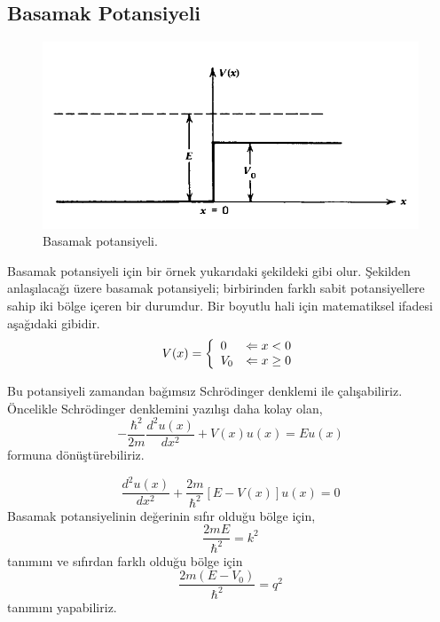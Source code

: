 \documentclass[a4paper,12pt, twoside]{article}
\begin{document}
\subsection{Basamak Potansiyeli}
\begin{figure}[hbtp]
	\centering
	\includegraphics[width=0.7\linewidth]{figurler/Basamak_Potansiyeli}
	\caption{Basamak potansiyeli.}
	\label{fig:basamakpotansiyeli}
\end{figure}
Basamak potansiyeli için bir örnek yukarıdaki şekildeki gibi olur. Şekilden anlaşılacağı üzere basamak potansiyeli; birbirinden farklı sabit potansiyellere sahip iki bölge içeren bir durumdur. Bir boyutlu hali için matematiksel ifadesi aşağıdaki gibidir.
\begin{equation}
V ( x )  = \left\{ 
\begin{array} { l l } 
{ 0 } & {\Leftarrow x < 0 } \\ 
{ V _ { 0 } } & {\Leftarrow x \geq 0 } 
\end{array} \right. 
\end{equation}

Bu potansiyeli zamandan bağımsız Schrödinger denklemi ile çalışabiliriz. Öncelikle Schrödinger denklemini yazılışı daha kolay olan,
\begin{equation}
- \frac { \hbar ^ { 2 } } { 2 m } \frac { d ^ { 2 } u ( x ) } { d x ^ { 2 } } + V ( x ) u ( x ) = E u ( x )
\end{equation}
formuna dönüştürebiliriz.

\begin{equation}
\frac { d ^ { 2 } u ( x ) } { d x ^ { 2 } } + \frac { 2 m } { \hbar ^ { 2 } } [ E - V ( x ) ] u ( x ) = 0
\end{equation}
Basamak potansiyelinin değerinin sıfır olduğu bölge için,
\begin{equation}
\frac { 2 m E } { \hbar ^ { 2 } } = k ^ { 2 }
\end{equation}
tanımını ve sıfırdan farklı olduğu bölge için
\begin{equation}
\frac { 2 m \left( E - V _ { 0 } \right) } { \hbar ^ { 2 } } = q ^ { 2 }
\end{equation}
tanımını yapabiliriz.
\end{document}

